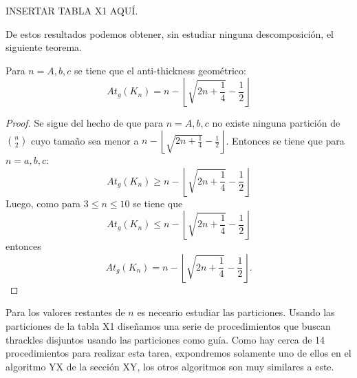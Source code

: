     INSERTAR TABLA X1 AQUÍ.

    De estos resultados podemos obtener, sin estudiar ninguna descomposición, el siguiente teorema.
    \begin{theorem}
      Para $n=A,b,c$ se tiene que el anti-thickness geométrico:
      \[At_g(K_n) = n - \left\lfloor\sqrt{2n+\frac{1}{4}} - \frac{1}{2}\right\rfloor \]
    \end{theorem}
    \begin{proof}
      Se sigue del hecho de que para $n=A,b,c$ no existe ninguna partición de
      $\binom{n}{2}$ cuyo tamaño sea menor a $n -
      \left\lfloor\sqrt{2n+\frac{1}{4}} - \frac{1}{2}\right\rfloor$. Entonces
      se tiene que para $n=a,b,c$: \[ At_g(K_n) \geq n -
      \left\lfloor\sqrt{2n+\frac{1}{4}} - \frac{1}{2}\right\rfloor\]
      Luego, como para $ 3 \leq n \leq 10$ se tiene que
      \[At_g(K_n) \leq n - \left\lfloor\sqrt{2n+\frac{1}{4}} -
      \frac{1}{2}\right\rfloor \]
      entonces \[At_g(K_n) = n - \left\lfloor\sqrt{2n+\frac{1}{4}} -
      \frac{1}{2}\right\rfloor. \]
    \end{proof}

    Para los valores restantes de $n$ es neceario estudiar las particiones.
    Usando las particiones de la tabla X1 diseñamos una serie de procedimientos
    que buscan thrackles disjuntos usando las particiones como guía. Como hay
    cerca de 14 procedimientos para realizar esta tarea, expondremos solamente
    uno de ellos en el algoritmo YX de la sección XY, los otros algoritmos son
    muy similares a este.

